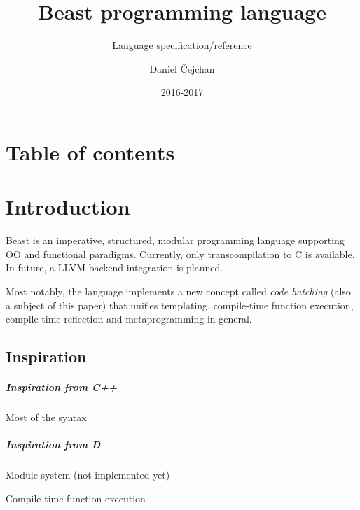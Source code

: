 




\setlength\extrarowheight{2pt}

\title{Beast programming language}
\subtitle{Language specification/reference}
\author{Daniel Čejchan}
\date{2016-2017}



\mainpage

\chapter{Table of contents}
{
	\renewcommand{\baselinestretch}{0.7}\normalsize
	\makeatletter
	\setcounter{tocdepth}{1}
	\makeatother
}

\chapter{Introduction}
Beast is an imperative, structured, modular programming language supporting OO and functional paradigms. Currently, only transcompilation to C is available. In future, a LLVM backend integration is planned.

Most notably, the language implements a new concept called \textit{code hatching} (also a subject of this paper) that unifies templating, compile-time function execution, compile-time reflection and metaprogramming in general.

\section{Inspiration}
\paragraph{Inspiration from C++}
\begin{compactitem}
	\item Most of the syntax
\end{compactitem}

\paragraph{Inspiration from D}
\begin{compactitem}
	\item Module system (not implemented yet)
	\item Compile-time function execution
\end{compactitem}

